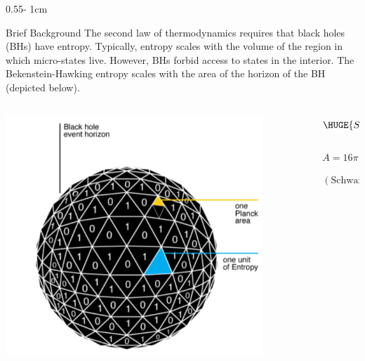 \documentclass{../psuposter}
\begin{document}
\begin{frame}
\begin{columns}[t, totalwidth=\textwidth]
\begin{column}{0.55\textwidth - 1cm}
    \begin{block}{Brief Background}
        The second law of thermodynamics requires that black holes (BHs) have entropy. Typically, entropy scales with the volume of the region in which micro-states live. However, BHs forbid access to states in the interior. The Bekenstein-Hawking entropy scales with the area of the horizon of the BH (depicted below). \cite{baggioliGravityHolographyApplications}

         \begin{columns}
        	\begin{column}{.5\linewidth}
            	\begin{center}
		    		\includegraphics[width=0.85\textwidth]{images/bekenstein-hawking-entropy}    		
    			\end{center}
    	    \end{column}
        	\begin{column}{.5\linewidth}
        		\vspace{5cm}
            	$$\HUGE{S_{BH} = \frac{A}{4L_p^2}}$$ 
            	
            	$$A=16 \pi (GM/c^2)^2$$
            	
            	$$(\text{Schwarzschild})$$
    	    \end{column}
	    \end{columns}
	    \vspace{1cm}
        

\end{block}
\end{column}
\end{columns}
\end{frame}
\end{document}
